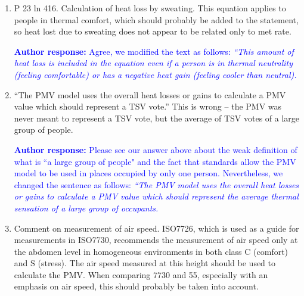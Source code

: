 \documentclass[a4paper, 10pt]{letter}
\newcommand{\response}[1]{\textcolor{blue}{\textbf{Author response:} #1}}
\begin{document}
\begin{letter}
\begin{enumerate}
            \response{
                We apologize for the mistake.
                We have revised the sentence to clarify this point and now reads as follows: \textit{``Additionally, the PMV model erroneously assumes that the human body is not capable of maintaining a stable core temperature.
                A \ac{pmv} value higher than \num{.5} or lower than \num{-.5} indicates that the hypothetical cylinder representing the human body is either gaining or losing heat, and consequently, it is getting warmer or colder, respectively.
                }
            }

            \item P 23 ln 416.
            Calculation of heat loss by sweating.
            This equation applies to people in thermal comfort, which should probably be added to the statement, so heat lost due to sweating does not appear to be related only to met rate.

            \response{Agree, we modified the text as follows: \textit{``This amount of heat loss is included in the equation even if a person is in thermal neutrality (feeling comfortable) or has a negative heat gain (feeling cooler than neutral).}}

            \item ``The PMV model uses the overall heat losses or gains to calculate a PMV value which should represent a TSV vote.'' This is wrong -- the PMV was never meant to represent a TSV vote, but the average of TSV votes of a large group of people.

            \response{
                Please see our answer above about the weak definition of what is ``a large group of people" and the fact that standards allow the PMV model to be used in places occupied by only one person.
                Nevertheless, we changed the sentence as follows: \textit{``The PMV model uses the overall heat losses or gains to calculate a PMV value which should represent the average thermal sensation of a large group of occupants.}
            }

            \item Comment on measurement of air speed.
            ISO7726, which is used as a guide for measurements in ISO7730, recommends the measurement of air speed only at the abdomen level in homogeneous environments in both class C (comfort) and S (stress).
            The air speed measured at this height should be used to calculate the PMV\@.
            When comparing 7730 and 55, especially with an emphasis on air speed, this should probably be taken into account.


\end{enumerate}
\end{letter}
\end{document}
